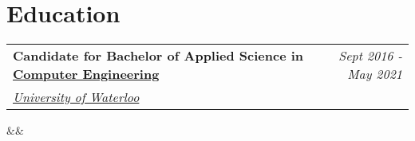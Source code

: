 \documentclass[11.9pt,letterpaper,sans]{moderncv}
\makeatletter
\renewcommand*{\cventry}[7][.25em]{
  \begin{tabular*}{\textwidth}{l@{\extracolsep{\fill}}r}%
      {\bfseries #3\ifthenelse{\equal{#6}{}}{}{, #6}} & {\itshape #2}\\%
      {\itshape #4} & {\itshape #5}\\%
  \end{tabular*}%
  \ifx&#7&%
    \else{\\\vbox{\small#7}}\fi%
  \par\addvspace{#1}}
\makeatother
\begin{document}
\maketitle
\vspace*{-1.2cm}


\section{\textbf{Education}}
\setlength{\hintscolumnwidth}{0.15\textwidth}
\renewcommand*{\cvitem}[3][.2em]{%
  \begin{tabular}{@{}p{\maincolumnwidth}@{\hspace{\separatorcolumnwidth}}p{\hintscolumnwidth}@{}}%
    {#3} &\raggedleft\hintstyle{#2}%
  \end{tabular}%
  \par\addvspace{#1}}

\cventry{\textcolor{color1}{Sept 2016 - May 2021}}{Candidate for Bachelor of Applied Science in \href{https://uwaterloo.ca/electrical-computer-engineering/future-undergraduate-students/computer-engineering}{Computer Engineering}}{\protect\hspace{2px}\href{http://uwaterloo.ca}{University of Waterloo}}{}{}{}




\end{document}
